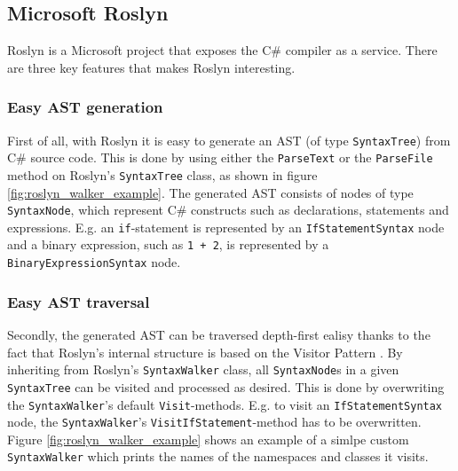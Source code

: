 \subsection{Microsoft Roslyn} %
\label{sub:microsoft_roslyn}
	Roslyn is a Microsoft project that exposes the C\# compiler as a service. There are three key features that makes Roslyn interesting.

  \subsubsection{Easy AST generation} %
  \label{ssub:easy_ast_generation}
  	First of all, with Roslyn it is easy to generate an AST (of type \texttt{SyntaxTree}) from C\# source code. This is done by using either the \texttt{ParseText} or the \texttt{ParseFile} method on Roslyn's \texttt{SyntaxTree} class, as shown in figure \ref{fig:roslyn_walker_example}. The generated AST consists of nodes of type \texttt{SyntaxNode}, which represent C\# constructs such as declarations, statements and expressions. E.g. an \texttt{if}-statement is represented by an \texttt{IfStatementSyntax} node and a binary expression, such as \texttt{1 + 2}, is represented by a \texttt{BinaryExpressionSyntax} node.

  \subsubsection{Easy AST traversal} %
  \label{ssub:subsubsection_name}
  	Secondly, the generated AST can be traversed depth-first ealisy thanks to the fact that Roslyn's internal structure is based on the Visitor Pattern \cite{bib:visitorpattern}. By inheriting from Roslyn's \texttt{SyntaxWalker} class, all \texttt{SyntaxNode}s in a given \texttt{SyntaxTree} can be visited and processed as desired. This is done by overwriting the \texttt{SyntaxWalker}'s default \texttt{Visit}-methods. E.g. to visit an \texttt{IfStatementSyntax} node, the \texttt{SyntaxWalker}'s \texttt{VisitIfStatement}-method has to be overwritten. Figure \ref{fig:roslyn_walker_example} shows an example of a simlpe custom \texttt{SyntaxWalker} which prints the names of the namespaces and classes it visits.

